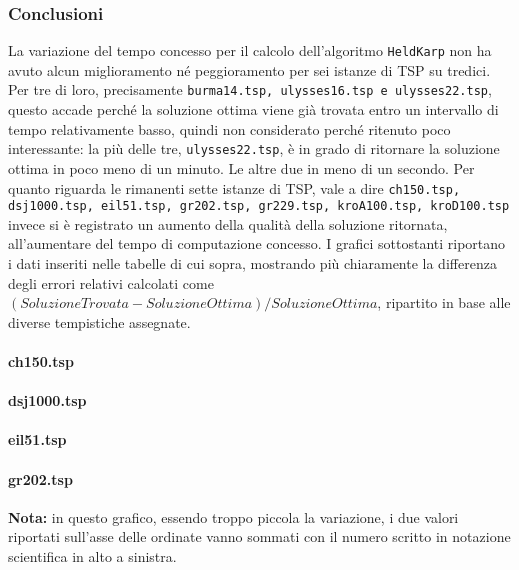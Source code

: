 \subsubsection{Conclusioni}
La variazione del tempo concesso per il calcolo dell'algoritmo \texttt{HeldKarp} non ha avuto alcun miglioramento né peggioramento per sei istanze di TSP su tredici. Per tre di loro, precisamente \texttt{burma14.tsp, ulysses16.tsp e ulysses22.tsp}, questo accade perché la soluzione ottima viene già trovata entro un intervallo di tempo relativamente basso, quindi non considerato perché ritenuto poco interessante: la più  delle tre, \texttt{ulysses22.tsp}, è in grado di ritornare la soluzione ottima in poco meno di un minuto. Le altre due in meno di un secondo.\eqcapo
Per quanto riguarda le rimanenti sette istanze di TSP, vale a dire \texttt{ch150.tsp, dsj1000.tsp, eil51.tsp, gr202.tsp, gr229.tsp, kroA100.tsp, kroD100.tsp} invece si è registrato un aumento della qualità della soluzione ritornata, all'aumentare del tempo di computazione concesso. I grafici sottostanti riportano i dati inseriti nelle tabelle di cui sopra, mostrando più chiaramente la differenza degli errori relativi calcolati come $(SoluzioneTrovata - SoluzioneOttima)/SoluzioneOttima$,  ripartito in base alle diverse tempistiche assegnate.
\paragraph*{ch150.tsp}
\paragraph*{dsj1000.tsp}
\paragraph*{eil51.tsp}
\paragraph*{gr202.tsp}
\textbf{Nota:} in questo grafico, essendo troppo piccola la variazione, i due valori riportati sull'asse delle ordinate vanno sommati con il numero scritto in notazione scientifica in alto a sinistra.
